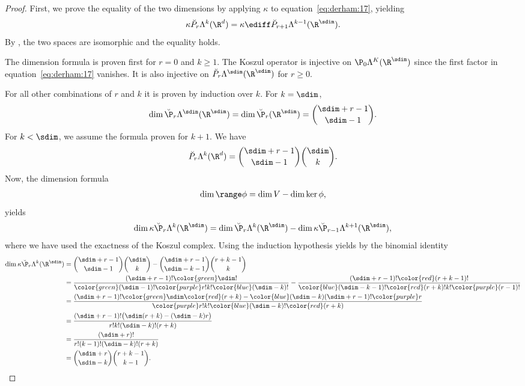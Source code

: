 \begin{proof}
  First, we prove the equality of the two dimensions by applying $\kappa$
  to equation~\eqref{eq:derham:17}, yielding
  \begin{gather}
    \kappa \breve P_r\Lambda^k(\R^d)
    = \kappa \ediff \breve P_{r+1}\Lambda^{k-1}(\R^\sdim).
  \end{gather}
  By , the two spaces are
  isomorphic and the equality holds.

  The dimension formula is proven first for $r=0$ and $k\ge 1$. The
  Koszul operator is injective on $\P_0\Lambda^K(\R^\sdim)$ since the
  first factor in equation~\eqref{eq:derham:17} vanishes. It is
  also injective on $\breve P_r\Lambda^\sdim(\R^\sdim)$ for $r\ge 0$.

  For all other combinations of $r$ and $k$ it is proven by induction
  over $k$. For $k=\sdim$,
  \begin{gather}
    \dim \breve\P_r\Lambda^\sdim(\R^\sdim) = \dim\breve\P_r(\R^\sdim)
    = \binom{\sdim+r-1}{\sdim-1}.
  \end{gather}
  For $k<\sdim$, we assume the formula proven for $k+1$. We have
  \begin{gather}
    \breve P_r\Lambda^k(\R^d) = \binom{\sdim+r-1}{\sdim-1}\binom{\sdim}{k}.
  \end{gather}
  Now, the dimension formula
  \begin{gather}
    \dim \range \phi = \dim V - \dim \ker \phi,
  \end{gather}
  yields
  \begin{gather}
    \dim\kappa\breve \P_r\Lambda^k(\R^\sdim) =
    \dim\breve \P_r\Lambda^k(\R^\sdim)
    - \dim\kappa\breve \P_{r-1}\Lambda^{k+1}(\R^\sdim),
  \end{gather}
  where we have used the exactness of the Koszul complex.
  Using the induction hypothesis yields by the binomial identity
  \begin{align}
    \dim\kappa\breve \P_r\Lambda^k(\R^\sdim)
    &= \binom{\sdim+r-1}{\sdim-1}\binom{\sdim}{k} - \binom{\sdim+r-1}{\sdim-k-1}\binom{r+k-1}{k}
    \\
    &= \frac{(\sdim+r-1)!{\color{green}\sdim!}}{{\color{green}(\sdim-1)!}{\color{purple}r!}k!{\color{blue}(\sdim-k)!}}
      - \frac{(\sdim+r-1)!{\color{red}(r+k-1)!}}{{\color{blue}(\sdim-k-1)!}
      {\color{red}(r+k)!}k!{\color{purple}(r-1)!}}
    \\
    &=
      \frac{(\sdim+r-1)!{\color{green}\sdim}{\color{red}(r+k)}-{\color{blue}(\sdim-k)}(\sdim+r-1)!{\color{purple}r}}
      {{\color{purple}r!}k!{\color{blue}(\sdim-k)!}{\color{red}(r+k)}}
    \\
    &= \frac{(\sdim+r-1)!\bigl(\sdim(r+k)-(\sdim-k)r\bigr)}{r!k!(\sdim-k)!(r+k)}
    \\
    &= \frac{(\sdim+r)!}{r!(k-1)!(\sdim-k)!(r+k)}
    \\
    &= \binom{\sdim+r}{\sdim-k}\binom{r+k-1}{k-1}.
  \end{align}
\end{proof}

